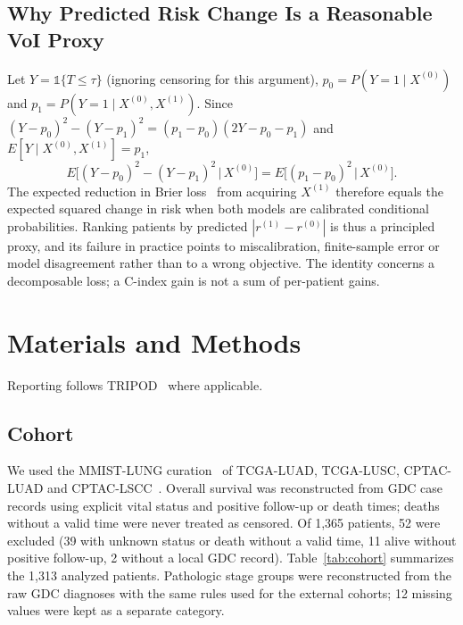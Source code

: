 \documentclass[journal,twoside,web]{IEEEtran}
\begin{document}
\subsection{Why Predicted Risk Change Is a Reasonable VoI Proxy}
\label{sec:voi-theory}
Let $Y = \mathbb{1}\{T \le \tau\}$ (ignoring censoring for this argument), $p_0 = P(Y{=}1 \mid X^{(0)})$ and $p_1 = P(Y{=}1 \mid X^{(0)}, X^{(1)})$. Since $(Y-p_0)^2-(Y-p_1)^2 = (p_1-p_0)(2Y-p_0-p_1)$ and $E[Y \mid X^{(0)},X^{(1)}] = p_1$,
\begin{equation}
E\big[(Y-p_0)^2-(Y-p_1)^2 \,\big|\, X^{(0)}\big] = E\big[(p_1-p_0)^2 \,\big|\, X^{(0)}\big].
\end{equation}
The expected reduction in Brier loss~\cite{brier1950} from acquiring $X^{(1)}$ therefore equals the expected squared change in risk when both models are calibrated conditional probabilities. Ranking patients by predicted $|r^{(1)} - r^{(0)}|$ is thus a principled proxy, and its failure in practice points to miscalibration, finite-sample error or model disagreement rather than to a wrong objective. The identity concerns a decomposable loss; a C-index gain is not a sum of per-patient gains.

\section{Materials and Methods}
\label{sec:methods}
Reporting follows TRIPOD~\cite{collins2015} where applicable.

\subsection{Cohort}
We used the MMIST-LUNG curation~\cite{mendes_mmist} of TCGA-LUAD, TCGA-LUSC, CPTAC-LUAD and CPTAC-LSCC~\cite{tcga_luad,tcga_lusc,gillette2020,satpathy2021}. Overall survival was reconstructed from GDC case records using explicit vital status and positive follow-up or death times; deaths without a valid time were never treated as censored. Of 1,365 patients, 52 were excluded (39 with unknown status or death without a valid time, 11 alive without positive follow-up, 2 without a local GDC record). Table~\ref{tab:cohort} summarizes the 1,313 analyzed patients. Pathologic stage groups were reconstructed from the raw GDC diagnoses with the same rules used for the external cohorts; 12 missing values were kept as a separate category.
\end{document}
